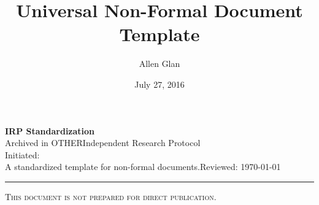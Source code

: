 \documentclass[a4paper, 11pt]{article}
\title{Universal Non-Formal Document Template}
\author{Allen Glan}
\date{July 27, 2016}
\makeatletter
\newcommand{\docdescription}{A standardized template for non-formal documents.}
\newcommand{\docproject}{IRP Standardization}
\newcommand{\docframework}{Independent Research Protocol}
\newcommand{\doccategory}{OTHER}
\newcommand{\docwarning}{This document is not prepared for direct publication.}
\newcommand{\docinitiated}{\@date}
\newcommand{\doctitle}{\@title}
\newcommand{\docauthors}{\@author}
\makeatother
\begin{document}
\noindent
\large\textbf{\doctitle} \hfill \textbf{\docproject} \\
\normalsize Archived in \doccategory \hfill \docframework \\
\docauthors \hfill Initiated: \docinitiated \\
\docdescription \hfill Reviewed: \today\\
\rule{\textwidth}{1pt}
\par
{\centering
\small\textsc{\docwarning}\par
}
\makeatother

\end{document}
